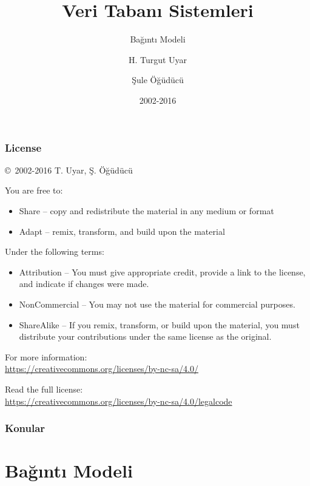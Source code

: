 \documentclass[dvipsnames]{beamer}
\title{Veri Tabanı Sistemleri}
\subtitle{Bağıntı Modeli}
\author{H. Turgut Uyar \and Şule Öğüdücü}
\date{2002-2016}
\theoremstyle{plain}
\begin{document}
\begin{frame}
  \titlepage
\end{frame}

\begin{frame}
 \frametitle{License}

  \hfill
  \copyright~2002-2016 T. Uyar, Ş. Öğüdücü

  \vfill
  \begin{footnotesize}
    You are free to:
    \begin{itemize}
      \itemsep0em
      \item Share -- copy and redistribute the material in any medium or format
      \item Adapt -- remix, transform, and build upon the material
    \end{itemize}

    Under the following terms:
    \begin{itemize}
      \itemsep0em
      \item Attribution -- You must give appropriate credit, provide a link to
        the license, and indicate if changes were made.

      \item NonCommercial -- You may not use the material for commercial
        purposes.

      \item ShareAlike -- If you remix, transform, or build upon the material,
        you must distribute your contributions under the same license as the
        original.
    \end{itemize}
  \end{footnotesize}

  \begin{small}
    For more information:\\
    \url{https://creativecommons.org/licenses/by-nc-sa/4.0/}

    \smallskip
    Read the full license:\\
    \url{https://creativecommons.org/licenses/by-nc-sa/4.0/legalcode}
  \end{small}
\end{frame}

\begin{frame}
  \frametitle{Konular}
  \tableofcontents
\end{frame}

\lstset{language=TutorialD}

\section{Bağıntı Modeli}
\end{document}
